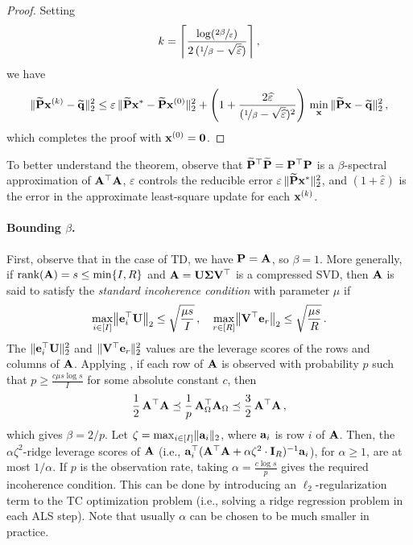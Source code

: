\begin{proof}
Setting
\[
k = \ceil*{\frac{\log(\sfrac{2\beta}{\epsilon})}{2\,(\nicefrac 1 \beta -\sqrt{\widehat{\epsilon}})}}\,,
\]
we have
\[
    \norm{\widetilde{\mat{P}} \mat{x}^{(k)}-\widetilde{\mat{q}}}_2^2
    \leq
    \epsilon\, \norm{\widetilde{\mat{P}} \mat{x}^{*} - \widetilde{\mat{P}} \mat{x}^{(0)}}_2^2 + \parens*{1+ \frac{2 \widehat{\epsilon}}{(\nicefrac 1  \beta - \sqrt{\widehat{\epsilon}})^2} }\, \min_{\mat{x}}\, \norm{\widetilde{\mat{P}} \mat{x}-\widetilde{\mat{q}}}_2^2\,,
\]
which completes the proof with $\mat{x}^{(0)}=\boldsymbol{0}$.
\end{proof}

\begin{remark}
To better understand the theorem, observe that
$\widetilde{\mat{P}}^\top \widetilde{\mat{P}} = \mat{P}^\top \mat{P}$ is a $\beta$-spectral approximation of $\mat{A}^\top \mat{A}$,
$\varepsilon$ controls the reducible error $\varepsilon\, \norm{\widetilde{\mat{P}} \mat{x}^*}_{2}^2$,
and $(1 + \widehat{\varepsilon})$ is the error in the approximate least-square update for each $\mat{x}^{(k)}$.
\end{remark}

\paragraph{Bounding $\beta$.}
First, observe that in the case of TD,
we have $\mat{P} = \mat{A}$, so $\beta = 1$.
More generally, if $\textnormal{rank}(\mat{A}) = s \le \min\{I, R\}$
and $\mat{A} = \mat{U}\mat{\Sigma}\mat{V}^\top$ is a compressed SVD, then $\mat{A}$ is said to satisfy  the \emph{standard incoherence condition} with parameter $\mu$ \citep{chen2015incoherence} if
\[
    \max_{i\in[I]} \norm*{\mat{e}_{i}^\top \mat{U}}_2 \leq \sqrt{\frac{\mu s}{I}}\,,
    \quad
    \max_{r\in[R]} \norm*{\mat{V} ^\top\mat{e}_r}_2 \leq \sqrt{\frac{\mu s}{R}}\,.
\]
The $\norm{\mat{e}_{i}^\top \mat{U}}_2^2$ and $\norm{\mat{V} ^\top\mat{e}_r}_2^2$ values are the leverage scores of the rows and columns of $\mat{A}$.
Applying \citet[Lemma 4]{cohen2015uniform},
if each row of $\mat{A}$ is observed with probability $p$ such that $p \geq \frac{c\mu s \log s}{I}$ for some absolute constant $c$, then 
\[
    \frac{1}{2} \,\mat{A}^\top \mat{A}
    \preceq
    \frac{1}{p} \, \mat{A}_{\Omega}^\top \mat{A}_{\Omega}
    \preceq
    \frac{3}{2}\, \mat{A}^\top \mat{A}\,,
\]
which gives $\beta=2/p$.
Let $\zeta = \max_{i\in[I]} \norm{\mat{a}_i}_2$, where $\mat{a}_i$ is row $i$ of $\mat{A}$.
Then, the $\alpha \zeta^2$-ridge leverage scores of $\mat{A}$ (i.e., $\mat{a}_i^\top (\mat{A}^\top \mat{A} + \alpha \zeta^2 \cdot\mat{I}_{R})^{-1} \mat{a}_i$), for $\alpha\geq 1$, are at most $1/\alpha$. If $p$ is the observation rate, taking $\alpha = \frac{c\log s}{p}$ gives the required incoherence condition. This can be done by introducing an $\ell_2$-regularization term to the TC optimization problem (i.e., solving a ridge regression problem in each ALS step).
Note that usually $\alpha$ can be chosen to be much smaller in practice.

